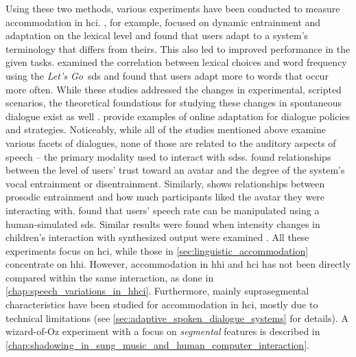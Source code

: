 Using these two methods, various experiments have been conducted to measure accommodation in \ac{hci}.
\citet{Bergqvist2020nontrivial, Lopes2011primes}, for example, focused on dynamic entrainment and adaptation on the lexical level and found that users adapt to a system's terminology that differs from theirs.
This also led to improved performance in the given tasks.
\citet{Parent2010lexical} examined the correlation between lexical choices and word frequency using the \emph{Let's Go}~\ac{sds} \citep{Raux2005letsgo} and found that users adapt more to words that occur more often.
While these studies addressed the changes in experimental, scripted scenarios, the theoretical foundations for studying these changes in spontaneous dialogue exist as well \citep{Brennan1996lexical}.
\citet{Gasic2013policy, Levin2000stochastic} provide examples of online adaptation for dialogue policies and strategies.
Noticeably, while all of the studies mentioned above examine various facets of dialogues, none of those are related to the auditory aspects of speech -- the primary modality used to interact with \acp{sds}.
\citet{Benus2018prosodic} found relationships between the level of users' trust toward an avatar and the degree of the system's vocal entrainment or disentrainment.
Similarly, \citet[][pp.~142-144]{Levitan2014acoustic} shows relationships between prosodic entrainment and how much participants liked the avatar they were interacting with.
\citet{Bell2003prosodic} found that users' speech rate can be manipulated using a human-simulated \ac{sds}.
Similar results were found when intensity changes in children's interaction with synthesized output were examined \citep{Coulston2002amplitude}.
All these experiments focus on \ac{hci}, while those in \cref{sec:linguistic_accommodation} concentrate on \ac{hhi}.
However, accommodation in \ac{hhi} and \ac{hci} has not been directly compared within the same interaction, as done in \cref{chap:speech_variations_in_hhci}.
Furthermore, mainly suprasegmental characteristics have been studied for accommodation in \ac{hci}, mostly due to technical limitations (see \cref{sec:adaptive_spoken_dialogue_systems} for details).
A wizard-of-Oz experiment with a focus on \emph{segmental} features is described in \cref{chap:shadowing_in_sung_music_and_human_computer_interaction}.